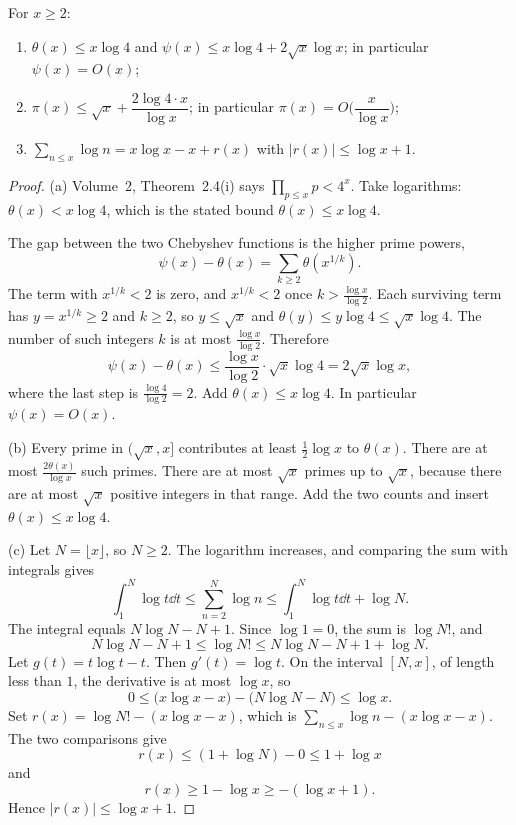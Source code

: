 \begin{proposition}\label{prop:chebyshev}
For $x\ge 2$:
\begin{enumerate}[label=(\alph*)]
\item $\theta(x)\le x\log 4$ and $\psi(x)\le x\log 4+2\sqrt x\log x$; in particular $\psi(x)=O(x)$;
\item $\pi(x)\le\sqrt x+\dfrac{2\log 4\cdot x}{\log x}$; in particular $\pi(x)=O\bigl(\dfrac x{\log x}\bigr)$;
\item $\displaystyle\sum_{n\le x}\log n=x\log x-x+r(x)$ with $|r(x)|\le\log x+1$.
\end{enumerate}
\end{proposition}
\begin{proof}
(a) Volume~2, Theorem~2.4(i) says $\prod_{p\le x}p<4^x$. Take logarithms: $\theta(x)<x\log 4$, which is the stated bound $\theta(x)\le x\log 4$.

The gap between the two Chebyshev functions is the higher prime powers,
\[
\psi(x)-\theta(x)=\sum_{k\ge 2}\theta(x^{1/k}).
\]
The term with $x^{1/k}<2$ is zero, and $x^{1/k}<2$ once $k>\frac{\log x}{\log 2}$. Each surviving term has $y=x^{1/k}\ge 2$ and $k\ge 2$, so $y\le\sqrt x$ and $\theta(y)\le y\log 4\le\sqrt x\log 4$. The number of such integers $k$ is at most $\frac{\log x}{\log 2}$. Therefore
\[
\psi(x)-\theta(x)\le\frac{\log x}{\log 2}\cdot\sqrt x\log 4=2\sqrt x\log x,
\]
where the last step is $\frac{\log 4}{\log 2}=2$. Add $\theta(x)\le x\log 4$. In particular $\psi(x)=O(x)$.

(b) Every prime in $(\sqrt x,x]$ contributes at least $\frac12\log x$ to $\theta(x)$. There are at most $\frac{2\theta(x)}{\log x}$ such primes. There are at most $\sqrt x$ primes up to $\sqrt x$, because there are at most $\sqrt x$ positive integers in that range. Add the two counts and insert $\theta(x)\le x\log 4$.

(c) Let $N=\lfloor x\rfloor$, so $N\ge 2$. The logarithm increases, and comparing the sum with integrals gives
\[
\int_1^N\log t\dd t\le\sum_{n=2}^N\log n\le\int_1^N\log t\dd t+\log N.
\]
The integral equals $N\log N-N+1$. Since $\log 1=0$, the sum is $\log N!$, and
\[
N\log N-N+1\le\log N!\le N\log N-N+1+\log N.
\]
Let $g(t)=t\log t-t$. Then $g'(t)=\log t$. On the interval $[N,x]$, of length less than $1$, the derivative is at most $\log x$, so
\[
0\le\bigl(x\log x-x\bigr)-\bigl(N\log N-N\bigr)\le\log x.
\]
Set $r(x)=\log N!-(x\log x-x)$, which is $\sum_{n\le x}\log n-(x\log x-x)$. The two comparisons give
\[
r(x)\le(1+\log N)-0\le 1+\log x
\]
and
\[
r(x)\ge 1-\log x\ge-(\log x+1).
\]
Hence $|r(x)|\le\log x+1$.
\end{proof}

